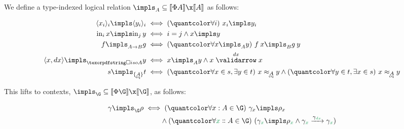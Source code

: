 \documentclass{rntz}\usepackage{fantasy}%
\begin{document}
\begin{definition}\label{def:approx}\label{def:approx-contexts}
  We define a type-indexed logical relation ${\impls_A} \subseteq \den{\Phi A} \x
  \den{A}$ as follows:

  \nopagebreak[2]
  \begin{align*}
    \tuple{x_i}_i \impls \tuple{y_i}_i &\iff \fa{i} x_i \impls y_i
    \\
    \inj i x \impls \inj j y &\iff i = j \wedge x \impls y
    \\
    f \impls_{A \to B} g &\iff \fa{x \impls_A y} f\<x \impls_B g\<y
    \\
    \tuple{x,\dx} \impls_{\isof A} y
    &\iff x \impls_A y \wedge \vld{\dx} x x
    \\
    s \impls_{\tseteq A} t
    &\iff \faex{x \in s}{y \in t} x\approx_{\eqt A} y
    \wedge \faex{y \in t}{x \in s} x \approx_{\eqt A} y
  \end{align*}

  \noindent
  This lifts to contexts, ${\impls_\G} \subseteq \den{\Phi\G} \x \den\G$, as
  follows:

  \nopagebreak[2]
  \begin{align*}
    \gamma \impls_\G \rho
    &\iff \fa{\h x A \in \G} \gamma_x \impls \rho_x
    \\ &\phantom{\iff}
    \wedge \fa{\hd x A \in \G}
    (\gamma_{\dvar x} \impls \rho_{\dvar x}
    \wedge \longvld{\gamma_{\dvar{\dx}}}{\gamma_{\dvar x}}{\gamma_{\dvar x}})
  \end{align*}
\end{definition}


\end{document}
